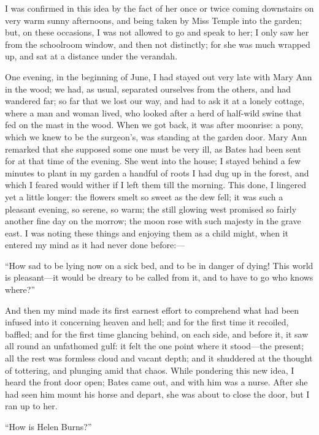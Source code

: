 I was confirmed in this idea by the fact of her once or twice coming
downstairs on very warm sunny afternoons, and being taken by Miss Temple
into the garden; but, on these occasions, I was not allowed to go and
speak to her; I only saw her from the schoolroom window, and then not
distinctly; for she was much wrapped up, and sat at a distance under the
verandah.

One evening, in the beginning of June, I had stayed out very late with
Mary Ann in the wood; we had, as usual, separated ourselves from the
others, and had wandered far; so far that we lost our way, and had to
ask it at a lonely cottage, where a man and woman lived, who looked
after a herd of half-wild swine that fed on the mast in the wood. When
we got back, it was after moonrise: a pony, which we knew to be the
surgeon's, was standing at the garden door. Mary Ann remarked that she
supposed some one must be very ill, as \Mr{} Bates had been sent for at
that time of the evening. She went into the house; I stayed behind a
few minutes to plant in my garden a handful of roots I had dug up in the
forest, and which I feared would wither if I left them till the
morning. This done, I lingered yet a little longer: the flowers smelt
so sweet as the dew fell; it was such a pleasant evening, so serene, so
warm; the still glowing west promised so fairly another fine day on the
morrow; the moon rose with such majesty in the grave east. I was noting
these things and enjoying them as a child might, when it entered my mind
as it had never done before:---

\enquote{How sad to be lying now on a sick bed, and to be in danger of
	dying! This world is pleasant---it would be dreary to be called from
	it, and to have to go who knows where?}

And then my mind made its first earnest effort to comprehend what had
been infused into it concerning heaven and hell; and for the first time
it recoiled, baffled; and for the first time glancing behind, on each
side, and before it, it saw all round an unfathomed gulf: it felt the
one point where it stood---the present; all the rest was formless cloud
and vacant depth; and it shuddered at the thought of tottering, and
plunging amid that chaos. While pondering this new idea, I heard the
front door open; \Mr{} Bates came out, and with him was a nurse. After
she had seen him mount his horse and depart, she was about to close the
door, but I ran up to her.

\enquote{How is Helen Burns?}

